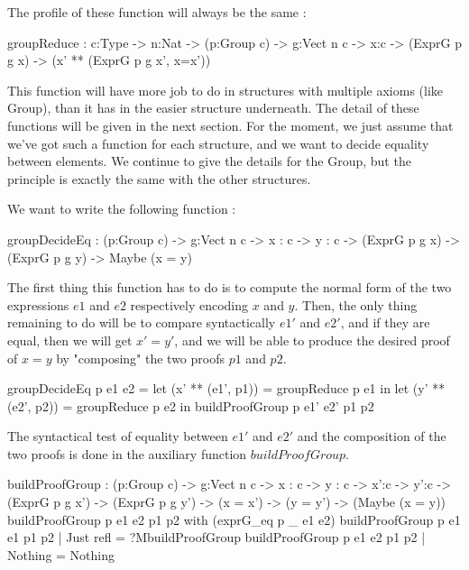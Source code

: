 \documentclass{sigplanconf}
\begin{document}
The profile of these function will always be the same :
\begin{code}[caption=Type of the reduction function for terms reflecting elements in a Group, captionpos=b, label=lst1:haskell2]
	groupReduce : {c:Type} -> {n:Nat} 
	  -> (p:Group c) -> {g:Vect n c} -> {x:c}
	  -> (ExprG p g x) 
	  -> (x' ** (ExprG p g x', x=x'))
\end{code}

This function will have more job to do in structures with multiple axioms (like Group), than it has in the easier structure underneath.
The detail of these functions will be given in the next section. For the moment, we just assume that we've got such a function for each structure, and we want to decide equality between elements. We continue to give the details for the Group, but the principle is exactly the same with the other structures.

We want to write the following function :
\begin{code}[caption=Type of the function for deciding equality between elements in a Group, captionpos=b, label=lst1:haskell2]
	groupDecideEq : (p:Group c) -> {g:Vect n c} 
	   -> {x : c} -> {y : c} 
	   -> (ExprG p g x) -> (ExprG p g y) 
	   -> Maybe (x = y)
\end{code}

The first thing this function has to do is to compute the normal form of the two expressions $e1$ and $e2$ respectively encoding $x$ and $y$.
Then, the only thing remaining to do will be to compare syntactically $e1'$ and $e2'$, and if they are equal, then we will get $x'=y'$, and we will be able to produce the desired proof of $x=y$ by "composing" the two proofs $p1$ and $p2$. 

\begin{code}[caption=Decides if two elements of a group are equal, captionpos=b, label=lst1:haskell2]
groupDecideEq p e1 e2 =
  let (x' ** (e1', p1)) = 
    groupReduce p e1 in
  let (y' ** (e2', p2)) = 
    groupReduce p e2 in
	     buildProofGroup p e1' e2' p1 p2
\end{code}

The syntactical test of equality between $e1'$ and $e2'$ and the composition of the two proofs is done in the auxiliary function $buildProofGroup$. 

\begin{code}[caption=Composes the two proofs if the NF are the same, captionpos=b, label=lst1:haskell2]
buildProofGroup : (p:Group c) -> {g:Vect n c} 
  -> {x : c} -> {y : c} 
  -> {x':c} -> {y':c} 
  -> (ExprG p g x') 
  -> (ExprG p g y') 
  -> (x = x') -> (y = y') 
  -> (Maybe (x = y))
buildProofGroup p e1 e2 p1 p2 
       with (exprG_eq p _ e1 e2)
	buildProofGroup p e1 e1 p1 p2 | Just refl = 
	         ?MbuildProofGroup
	buildProofGroup p e1 e2 p1 p2 | Nothing =
	          Nothing
\end{code}
\end{document}
